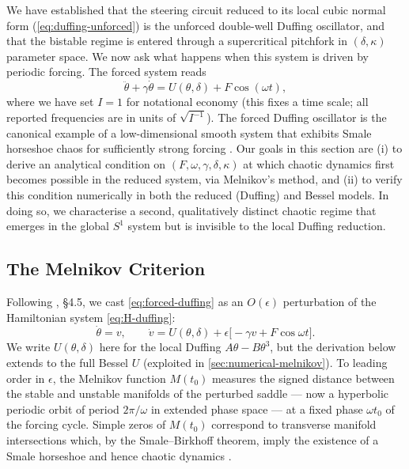 \documentclass[11pt, a4paper]{article}
\begin{document}
We have established that the steering circuit reduced to its local cubic normal
form (\cref{eq:duffing-unforced}) is the unforced double-well Duffing oscillator,
and that the bistable regime is entered through a supercritical pitchfork in
$(\delta, \kappa)$ parameter space.  We now ask what happens when this system is
driven by periodic forcing.  The forced system reads
%
\begin{equation}
\label{eq:forced-duffing}
\ddot\theta + \gamma\dot\theta = U(\theta, \delta) + F\cos(\omega t),
\tag{24}
\end{equation}
%
where we have set $I = 1$ for notational economy (this fixes a time scale; all
reported frequencies are in units of $\sqrt{I^{-1}}$).  The forced Duffing
oscillator is the canonical example of a low-dimensional smooth system that
exhibits Smale horseshoe chaos for sufficiently strong forcing
\cite{guckenheimer1983}.  Our goals in this section are (i) to derive an
analytical condition on $(F, \omega, \gamma, \delta, \kappa)$ at which chaotic
dynamics first becomes possible in the reduced system, via Melnikov's method, and
(ii) to verify this condition numerically in both the reduced (Duffing) and Bessel
models.  In doing so, we characterise a second, qualitatively distinct chaotic
regime that emerges in the global $S^1$ system but is invisible to the local
Duffing reduction.


\subsection{The Melnikov Criterion}
\label{sec:melnikov}

Following \textcite{guckenheimer1983}, \S4.5, we cast \cref{eq:forced-duffing}
as an $O(\epsilon)$ perturbation of the Hamiltonian system \eqref{eq:H-duffing}:
%
\begin{equation}
\label{eq:perturbed-system}
\dot\theta = v,
\qquad
\dot v = U(\theta, \delta) + \epsilon\bigl[-\gamma v + F\cos\omega t\bigr].
\tag{25}
\end{equation}
%
We write $U(\theta,\delta)$ here for the local Duffing $A\theta - B\theta^3$,
but the derivation below extends to the full Bessel $U$ (exploited in
\cref{sec:numerical-melnikov}).  To leading order in $\epsilon$, the Melnikov
function $M(t_0)$ measures the signed distance between the stable and unstable
manifolds of the perturbed saddle --- now a hyperbolic periodic orbit of period
$2\pi/\omega$ in extended phase space --- at a fixed phase $\omega t_0$ of the
forcing cycle.  Simple zeros of $M(t_0)$ correspond to transverse manifold
intersections which, by the Smale--Birkhoff theorem, imply the existence of a
Smale horseshoe and hence chaotic dynamics \cite[Theorem~4.5.3]{guckenheimer1983}.
\end{document}
